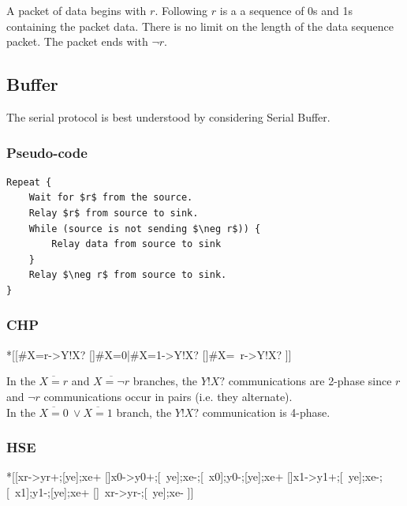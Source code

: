 \documentclass{article}
\begin{document}
A packet of data begins with $r$.
Following $r$ is a a sequence of 0s and 1s containing the packet data.
There is no limit on the length of the data sequence packet.
The packet ends with $\neg r$. 

\subsection{Buffer}

\noindent
The serial protocol is best understood by considering Serial Buffer.

\subsubsection*{Pseudo-code}

\begin{lstlisting}[mathescape]
Repeat {
    Wait for $r$ from the source.
    Relay $r$ from source to sink.
    While (source is not sending $\neg r$)) {
        Relay data from source to sink
    }
    Relay $\neg r$ from source to sink.
}
\end{lstlisting}

\subsubsection*{CHP}

\begin{csp}
*[[#{X=r}->Y!X?
  []#{X=0}|#{X=1}->Y!X?
  []#{X=\neg\ r}->Y!X?
 ]]
\end{csp}

\noindent
In the $\overline{X=r}$ and $\overline{X=\neg r}$ branches,
the $Y!X?$ communications are 2-phase since $r$ and $\neg r$ 
communications occur in pairs (i.e. they alternate). \\
In the $\overline{X=0}\ \vee \overline{X=1}$ branch,
the $Y!X?$ communication is 4-phase.


\subsubsection*{HSE}

\begin{hse}
*[[xr->yr+;[ye];xe+
  []x0->y0+;[~ye];xe-;[~x0];y0-;[ye];xe+
  []x1->y1+;[~ye];xe-;[~x1];y1-;[ye];xe+
  []~xr->yr-;[~ye];xe-
 ]]
\end{hse}
\end{document}
